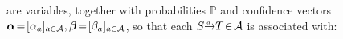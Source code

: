 \begin{defn}
    are
    variables,
    together with 
    probabilities $\mathbb P$
    and
    confidence vectors
    $\boldsymbol\alpha \!=\! [\alpha_a]_{a \in \mathcal A},\boldsymbol\beta \!=\! [\beta_a]_{a \in \mathcal A}$,
    so that
    each $\ed aST \! \in\! \Ar$ is associated with:
    

\end{defn}
